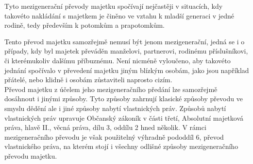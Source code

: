 \documentclass{article}
\begin{document}
Tyto mezigenerační převody majetku spočívají nejčastěji v situacích, kdy takovéto nakládání s majetkem je činěno ve vztahu k mladší generaci v jedné rodině, tedy především k potomkům a prapotomkům. 

Tento převod majetku samozřejmě nemusí být jenom mezigenerační, jedná se i o případy, kdy byl majetek převáděn manželovi, partnerovi, rodinému příslušníkovi, či kterémukoliv dalšímu příbuznému. Není nicméně vyloučeno, aby takovéto jednání spočívalo v převedení majetku jiným blízkým osobám, jako jsou například přátelé, nebo klidně i osobám zůstaviteli naprosto cizím.\\



Převod majetku z účelem jeho mezigeneračního předání lze samozřejmě dosáhnout i jinými způsoby. Tyto způsoby zahrnují klasické způsoby převodu ve smyslu dědění ale i jiné způsoby nabytí vlastnických práv. Způsobů nabytí vlastnických práv upravuje Občanský zákoník v části třetí, Absolutní majetková práva, hlavě II., věcná práva, dílu 3, oddílu 2 hned několik. V rámci mezigeneračního převodu je však použitelný výhradně pododdíl 6, převod vlastnického práva, na kterém stojí i všechny odlišné způsoby mezigeneračního převodu majetku.

\end{document}
